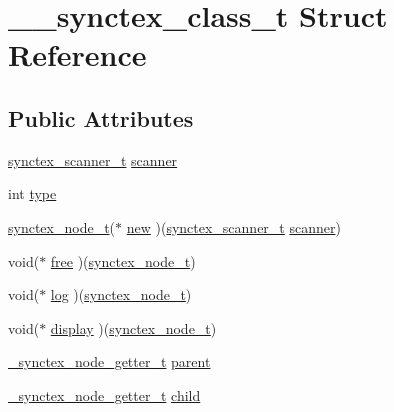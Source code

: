 \hypertarget{struct____synctex__class__t}{\section{\+\_\+\+\_\+synctex\+\_\+class\+\_\+t Struct Reference}
\label{struct____synctex__class__t}
}
\subsection*{Public Attributes}
\begin{DoxyCompactItemize}
\item 
\hyperlink{synctex__parser_8h_a9fa4d5ea994bd4b018380f1ba72dfe9b}{synctex\+\_\+scanner\+\_\+t} \hyperlink{struct____synctex__class__t_ae7c5f8184868bbf7221bc3f381a92ac6}{scanner}
\item 
int \hyperlink{struct____synctex__class__t_aeafcb7d3d64d9a0c0632bd1d6e84b961}{type}
\item 
\hyperlink{synctex__parser_8h_a78e6c0b9c2b02f3c486a2cbffeabaeae}{synctex\+\_\+node\+\_\+t}($\ast$ \hyperlink{struct____synctex__class__t_ab4c75f21dbfd5421534d42feeab86a0f}{new} )(\hyperlink{synctex__parser_8h_a9fa4d5ea994bd4b018380f1ba72dfe9b}{synctex\+\_\+scanner\+\_\+t} \hyperlink{struct____synctex__class__t_ae7c5f8184868bbf7221bc3f381a92ac6}{scanner})
\item 
void($\ast$ \hyperlink{struct____synctex__class__t_a251c015a17ed979c27cfc0934ab54f76}{free} )(\hyperlink{synctex__parser_8h_a78e6c0b9c2b02f3c486a2cbffeabaeae}{synctex\+\_\+node\+\_\+t})
\item 
void($\ast$ \hyperlink{struct____synctex__class__t_a25c33b646d9ef2dfa10512fd57e319dd}{log} )(\hyperlink{synctex__parser_8h_a78e6c0b9c2b02f3c486a2cbffeabaeae}{synctex\+\_\+node\+\_\+t})
\item 
void($\ast$ \hyperlink{struct____synctex__class__t_a560e0e5d2b1f56ce37b8afb179a56ec7}{display} )(\hyperlink{synctex__parser_8h_a78e6c0b9c2b02f3c486a2cbffeabaeae}{synctex\+\_\+node\+\_\+t})
\item 
\hyperlink{synctex__parser_8c_a68776561342fb5faed30d828674970dc}{\+\_\+synctex\+\_\+node\+\_\+getter\+\_\+t} \hyperlink{struct____synctex__class__t_af0db912f330c3b398c7e95eb2576ba4f}{parent}
\item 
\hyperlink{synctex__parser_8c_a68776561342fb5faed30d828674970dc}{\+\_\+synctex\+\_\+node\+\_\+getter\+\_\+t} \hyperlink{struct____synctex__class__t_ace25029406ca336f39872a8b77564748}{child}
\item 

\end{DoxyCompactItemize}
